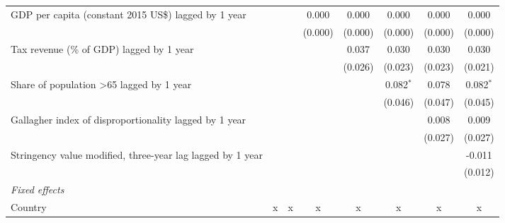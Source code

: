 \begin{tabular}{lccccccc}
   GDP per capita (constant 2015 US\$) lagged by 1 year                                           &                &               & 0.000          & 0.000         & 0.000         & 0.000         & 0.000\\   
                                                                                                  &                &               & (0.000)        & (0.000)       & (0.000)       & (0.000)       & (0.000)\\   
   Tax revenue (\% of GDP) lagged by 1 year                                                       &                &               &                & 0.037         & 0.030         & 0.030         & 0.030\\   
                                                                                                  &                &               &                & (0.026)       & (0.023)       & (0.023)       & (0.021)\\   
   Share of population >65 lagged by 1 year                                                       &                &               &                &               & 0.082$^{*}$   & 0.078         & 0.082$^{*}$\\   
                                                                                                  &                &               &                &               & (0.046)       & (0.047)       & (0.045)\\   
   Gallagher index of disproportionality lagged by 1 year                                         &                &               &                &               &               & 0.008         & 0.009\\   
                                                                                                  &                &               &                &               &               & (0.027)       & (0.027)\\   
   Stringency value modified, three-year lag lagged by 1 year                                     &                &               &                &               &               &               & -0.011\\   
                                                                                                  &                &               &                &               &               &               & (0.012)\\   
   \emph{Fixed effects}\\
   Country                                                                                        & x              & x             & x              & x             & x             & x             & x\\  

\end{tabular}
